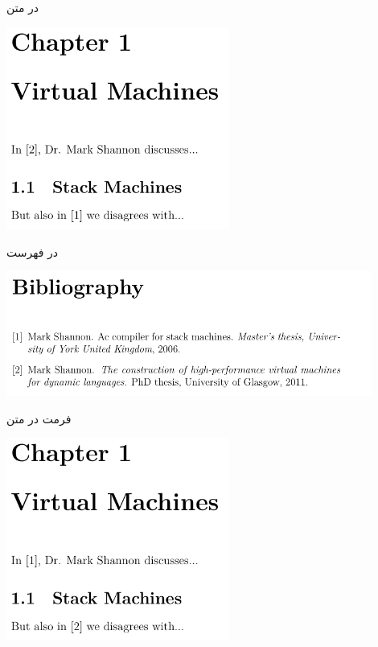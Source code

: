 \begin{frame}{در متن}
\begin{center}
\includegraphics[width=0.55\textwidth, height=0.7\textheight]{docs/images/plain-1}
\end{center}
\end{frame}

\begin{frame}{در فهرست}
\begin{center}
\includegraphics[width=0.9\textwidth, height=0.5\textheight]{docs/images/plain-2}
\end{center}
\end{frame}

\begin{frame}{فرمت  در متن}
\begin{center}
\includegraphics[width=0.55\textwidth, height=0.7\textheight]{docs/images/unsrt-1}
\end{center}
\end{frame}

